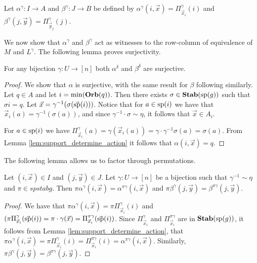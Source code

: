 \documentclass[../paper.tex]{subfiles}
\begin{document}
Let $\alpha^{\gamma}: I \rightarrow A$ and $\beta^{\gamma}: J \rightarrow B$ be
defined by $\alpha^{\gamma} (i, \vec{x}) = \Pi^{\gamma}_{\vec{x}_{i}}(i)$ and
$\beta^{\gamma} (j, \vec{y}) = \Pi^{\gamma}_{\vec{y}_{j}}(j)$.

We now show that $\alpha^{\gamma}$ and $\beta^{\gamma}$ act as witnesses to the
row-column of equivalence of $M$ and $L^{\gamma}$. The following lemma proves
surjectivity.

\begin{lem} 
  For any bijection $\gamma : U \rightarrow [n]$ both $\alpha^{\delta}$ and
  $\beta^{\delta}$ are surjective.
\end{lem}
\begin{proof}
  We show that $\alpha$ is surjective, with the same result for $\beta$
  following similarly. Let $q \in A$ and let $i = \min (\text{\textbf{Orb}} (q))$. Then there
  exists $\sigma \in \text{\textbf{Stab}} (\text{sp} (g))$ such that $\sigma i = q$. Let $\vec{x} =
  \gamma^{-1} (\sigma(\vec{\text{sp}}(i)))$. Notice that for $a \in \text{sp}(i)$ we
  have that $\vec{x}_i(a) = \gamma^{-1} (\sigma (a))$, and since $\gamma^{-1}
  \cdot \sigma \sim \eta$, it follows that $\vec{x} \in A_i$.

  For $a \in \text{sp}(i)$ we have $\Pi^{\gamma}_{\vec{x}_i} (a) = \gamma
  (\vec{x}_i(a)) = \gamma \cdot \gamma^{-1} \sigma (a) = \sigma (a)$. From Lemma
  \ref{lem:support_determine_action} it follows that $\alpha(i, \vec{x}) = q$.
\end{proof}

The following lemma allows us to factor through permutations.
\begin{lem}
  \label{lem:alpha_and_gamma}
  Let $(i,\vec{x}) \in I$ and $(j, \vec{y}) \in J$. Let $\gamma: U \rightarrow
  [n]$ be a bijection such that $\gamma^{-1} \sim \eta$ and $\pi \in spstab{g}$.
  Then $\pi \alpha^{\gamma}(i, \vec{x}) = \alpha^{\pi \gamma}(i, \vec{x})$ and
  $\pi \beta^{\gamma}(j, \vec{y}) = \beta^{\pi \gamma}(j, \vec{y})$.
\end{lem}
\begin{proof}
  We have that $\pi \alpha^{\gamma}(i, \vec{x}) = \pi
  \Pi^{\gamma}_{\vec{x}_i}(i)$ and $(\pi
  \Pi^{\gamma}_{\vec{x}_{i}}(\vec{\text{sp}}(i)) = \pi \cdot \gamma (\vec{x}) =
  \Pi^{\pi \gamma}_{\vec{x}_i}(\vec{\text{sp}}(i))$. Since
  $\Pi^{\gamma}_{\vec{x}_i}$ and $\Pi^{\pi \gamma}_{\vec{x}_i}$ are in
  $\text{\textbf{Stab}} (\text{sp} (g))$, it follows from Lemma \ref{lem:support_determine_action}, that
  $\pi \alpha^{\gamma}(i, \vec{x}) = \pi \Pi^{\gamma}_{\vec{x}_i} (i) = \Pi^{\pi
    \gamma}_{\vec{x}_i}(i) = \alpha^{\pi \gamma}(i, \vec{x})$. Similarly, $\pi
  \beta^{\gamma}(j, \vec{y}) = \beta^{\pi \gamma} (j, \vec{y})$.
\end{proof}
\end{document}
